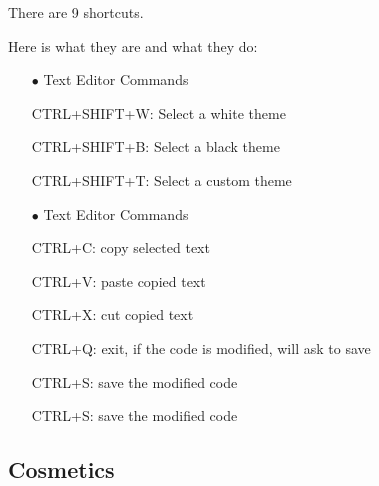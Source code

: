 \documentclass[a4paper,12pt]{article}
\begin{document}
There are 9 shortcuts.

Here is what they are and what they do:

\begin{itemize}
	\setlength{\itemindent}{1em}
	\item[$\bullet$] Text Editor Commands
	\setlength{\itemindent}{3em}
		\item[\ding{118}] CTRL+SHIFT+W: Select a white theme
		\item[\ding{118}] CTRL+SHIFT+B: Select a black theme
		\item[\ding{118}] CTRL+SHIFT+T: Select a custom theme

	\setlength{\itemindent}{1em}
	\item[$\bullet$] Text Editor Commands
	\setlength{\itemindent}{3em}
		\item[\ding{118}] CTRL+C: copy selected text
		\item[\ding{118}] CTRL+V: paste copied text
		\item[\ding{118}] CTRL+X: cut copied text
		\item[\ding{118}] CTRL+Q: exit, if the code is modified, will ask to save
		\item[\ding{118}] CTRL+S: save the modified code
		\item[\ding{118}] CTRL+S: save the modified code
\end{itemize}


\subsection{Cosmetics}\label{cosmetics}
\end{document}
